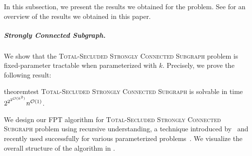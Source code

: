 In this subsection, we present the results we obtained for the problem. See  for an overview of the results we obtained in this paper. 

\subparagraph*{Strongly Connected Subgraph.} We show that the \textsc{Total-Secluded Strongly Connected Subgraph} problem is fixed-parameter tractable when parameterized with $k$. Precisely, we prove the following result:

\begin{restatable}[]{theorem}{test}
\label{cor:scc_algo}
  \textsc{Total-Secluded Strongly Connected Subgraph} is solvable in time $2^{2^{2^{\mathcal{O}(k^2)}}}n^{\mathcal{O}(1)}$.
\end{restatable}






We design our FPT algorithm for \textsc{Total-Secluded Strongly Connected Subgraph} problem using recursive understanding, a technique introduced by~\cite{grohe2011finding} and recently used successfully for various parameterized problems~\cite{chitnis2016designing,golovach2020finding,cygan2014minimum,lokshtanov2018reducing}.
We visualize the overall structure of the algorithm in .



